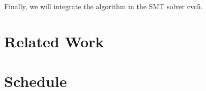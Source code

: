 \documentclass[a4paper, 12pt]{article}
\newcommand{\yell}[1]{{\color{blue} [#1]}}
\newcommand{\tom}[1]{\yell{#1 --tom}}
\begin{document}
Finally, we will integrate the algorithm in the SMT solver cvc5.






\section{Related Work}










\section{Schedule}

\end{document}
